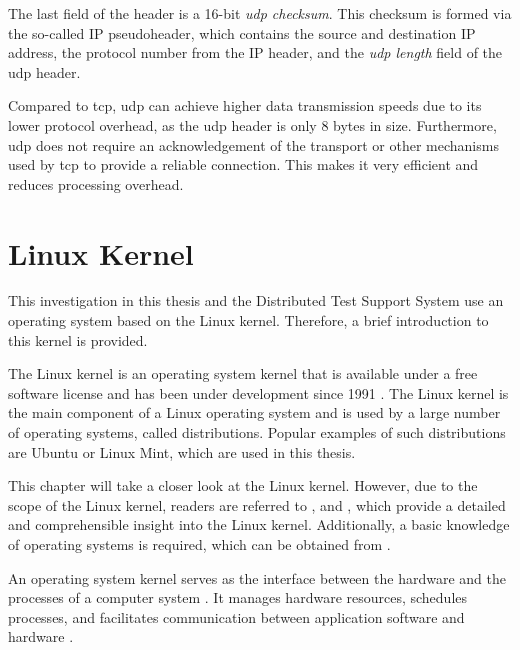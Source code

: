 The last field of the header is a 16-bit \textit{\ac{udp} checksum}. This checksum is formed via the so-called IP pseudoheader, which contains the source and destination IP address, the protocol number from the IP header, and the \textit{\ac{udp} length} field of the \ac{udp} header.

Compared to \ac{tcp}, \ac{udp} can achieve higher data transmission speeds due to its lower protocol overhead, as the \ac{udp} header is only 8 bytes in size. Furthermore, \ac{udp} does not require an acknowledgement of the transport or other mechanisms used by \ac{tcp} to provide a reliable connection. This makes it very efficient and reduces processing overhead.

\clearpage

\section{Linux Kernel}
This investigation in this thesis and the Distributed Test Support System use an operating system based on the Linux kernel. Therefore, a brief introduction to this kernel is provided.

The Linux kernel is an operating system kernel that is available under a free software license and has been under development since 1991 \cite{like01}. The Linux kernel is the main component of a Linux operating system and is used by a large number of operating systems, called distributions. Popular examples of such distributions are Ubuntu or Linux Mint, which are used in this thesis.

This chapter will take a closer look at the Linux kernel. However, due to the scope of the Linux kernel, readers are referred to \cite{like02}, \cite{like03} and \cite{like08}, which provide a detailed and comprehensible insight into the Linux kernel. Additionally, a basic knowledge of operating systems is required, which can be obtained from \cite{like05}.

An operating system kernel serves as the interface between the hardware and the processes of a computer system \cite{like04}. It manages hardware resources, schedules processes, and facilitates communication between application software and hardware \cite{like06}.

